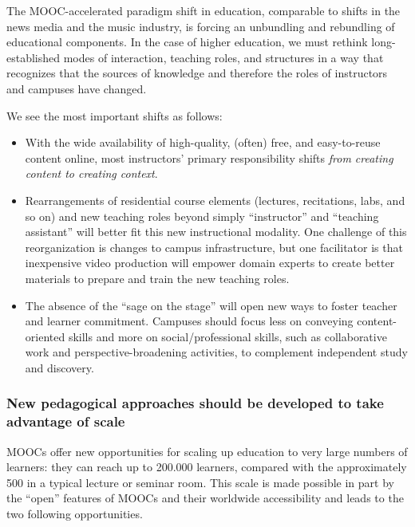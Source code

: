 \documentclass[a4paper,UKenglish]{dagman}
\begin{document}
The MOOC-accelerated paradigm shift in education, comparable to shifts in the news media and the
music industry, is forcing an unbundling and rebundling of educational components. In the case of
higher education, we must rethink long-established modes of interaction, teaching roles, and
structures in a way that recognizes that the sources of knowledge and therefore the roles of
instructors and campuses have changed.

We see the most important shifts as follows:

\begin{itemize}

\item With the wide availability of high-quality, (often) free, and easy-to-reuse content online,
  most instructors' primary responsibility shifts \emph{from creating content to creating context}.

\item Rearrangements of residential course elements (lectures, recitations, labs, and so on) and new
  teaching roles beyond simply ``instructor'' and ``teaching assistant'' will better fit this new
  instructional modality.  One challenge of this reorganization is changes to campus infrastructure,
  but one facilitator is that inexpensive video production will empower domain experts to create
  better materials to prepare and train the new teaching roles.

\item The absence of the ``sage on the stage'' will open new ways to foster teacher and learner
  commitment.  Campuses should focus less on conveying content-oriented skills and more on
  social/professional skills, such as collaborative work and perspective-broadening activities, to
  complement independent study and discovery.

\end{itemize} 

\subsubsection*{New pedagogical approaches should be developed to take advantage of scale}

MOOCs offer new opportunities for scaling up education to very large numbers of learners: they can
reach up to 200.000 learners, compared with the approximately 500 in a typical lecture or seminar
room.  This scale is made possible in part by the ``open'' features of MOOCs and their worldwide
accessibility and leads to the two following opportunities.
\end{document}

